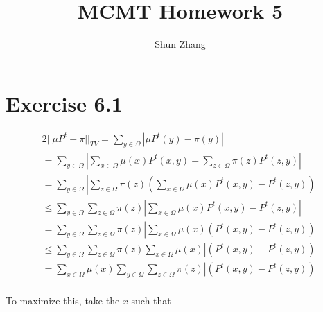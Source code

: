 \documentclass[10pt]{article}
\title{MCMT Homework 5}
\author{Shun Zhang}
\date{}
\begin{document}
\maketitle

\section*{Exercise 6.1}

\begin{multline*}
2 ||\mu P^t - \pi||_{TV} 
= \sum_{y \in \Omega} |\mu P^t(y) - \pi (y)| \\
= \sum_{y \in \Omega} |\sum_{x \in \Omega}\mu(x) P^t(x, y) - \sum_{z \in
\Omega}\pi (z) P^t(z, y)| \\
= \sum_{y \in \Omega} |\sum_{z \in \Omega}\pi (z) (\sum_{x \in \Omega}\mu(x)
P^t(x, y) - P^t(z, y))| \\
\leq \sum_{y \in \Omega} \sum_{z \in \Omega}\pi (z) |\sum_{x \in \Omega}\mu(x)
P^t(x, y) - P^t(z, y)| \\
= \sum_{y \in \Omega} \sum_{z \in \Omega}\pi (z) |\sum_{x \in \Omega}\mu(x)
(P^t(x, y) - P^t(z, y))| \\
\leq \sum_{y \in \Omega} \sum_{z \in \Omega}\pi (z) \sum_{x \in \Omega}\mu(x)
|(P^t(x, y) - P^t(z, y))| \\
= \sum_{x \in \Omega} \mu(x) \sum_{y \in \Omega} \sum_{z \in \Omega}\pi (z) 
|(P^t(x, y) - P^t(z, y))| \\
\end{multline*}

To maximize this, take the $x$ such that 
\end{document}
